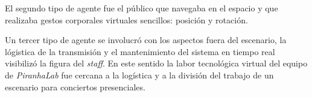 El segundo tipo de agente fue el público que navegaba en el espacio y que realizaba gestos corporales virtuales sencillos: posición y rotación. 

Un tercer tipo de agente se involucró con los aspectos fuera del escenario, la lógistica de la transmisión y el mantenimiento del sistema en tiempo real visibilizó la figura del \textit{staff}. En este sentido la labor tecnológica virtual del equipo de \textit{PiranhaLab} fue cercana a la logística y a la división del trabajo de un escenario para conciertos presenciales. 
